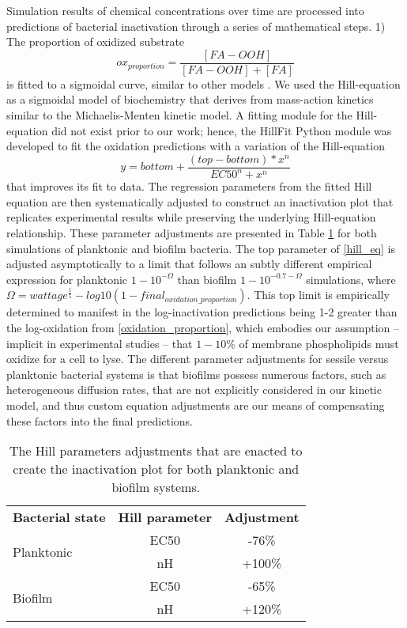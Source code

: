 Simulation results of chemical concentrations over time are processed into predictions of bacterial inactivation through a series of mathematical steps. 1) The proportion of oxidized substrate
\begin{equation} \label{oxidation_proportion}
    ox_{proportion} = \frac{[FA-OOH]}{[FA-OOH]+[FA]}
\end{equation}
is fitted to a sigmoidal curve, similar to other models \cite{Xiong1999AInactivation}. We used the Hill-equation \cite{Gesztelyi2012ThePharmacology} as a sigmoidal model of biochemistry that derives from mass-action kinetics similar to the Michaelis-Menten kinetic model. A fitting module for the Hill-equation did not exist prior to our work; hence, the HillFit Python module was developed to fit the oxidation predictions with a variation of the Hill-equation \cite{Inoue2016OscillationActivation} 
\begin{equation} \label{hill_eq}
    y=bottom+\frac{(top-bottom)*x^n}{EC50^n+x^n}
\end{equation}
that improves its fit to data. The regression parameters from the fitted Hill equation are then systematically adjusted to construct an inactivation plot that replicates experimental results while preserving the underlying Hill-equation relationship. These parameter adjustments are presented in Table \ref{hill_parameters} for both simulations of planktonic and biofilm bacteria. The top parameter of \cref{hill_eq} is adjusted asymptotically to a limit that follows an subtly different empirical expression for planktonic $1-10^{-\Omega}$ than biofilm $1-10^{-0.7-\Omega }$ simulations, where $\Omega = wattage^{\frac{1}{5}}-log10(1-final_{oxidation\_proportion})$. This top limit is empirically determined to manifest in the log-inactivation predictions being 1-2 greater than the log-oxidation from \cref{oxidation_proportion}, which embodies our assumption -- implicit in experimental studies -- that $1-10\%$ of membrane phospholipids must oxidize for a cell to lyse. The different parameter adjustments for sessile versus planktonic bacterial systems is that biofilms possess numerous factors, such as heterogeneous diffusion rates, that are not explicitly considered in our kinetic model, and thus custom equation adjustments are our means of compensating these factors into the final predictions. 

\begin{table}[]
    \centering
    \begin{tabular}{l|c|c}
        \textbf{Bacterial state} & \textbf{Hill parameter} & \textbf{Adjustment} \\
        \multirow{2}{}{Planktonic} & EC50 & -76\% \\
         & nH & +100\% \\
         \midrule
         \multirow{2}{}{Biofilm} & EC50 & -65\% \\
         & nH & +120\% \\
    \end{tabular}
    \caption{
        The Hill parameters adjustments that are enacted to create the inactivation plot for both planktonic and biofilm systems. 
    }
    \label{hill_parameters}
\end{table}

